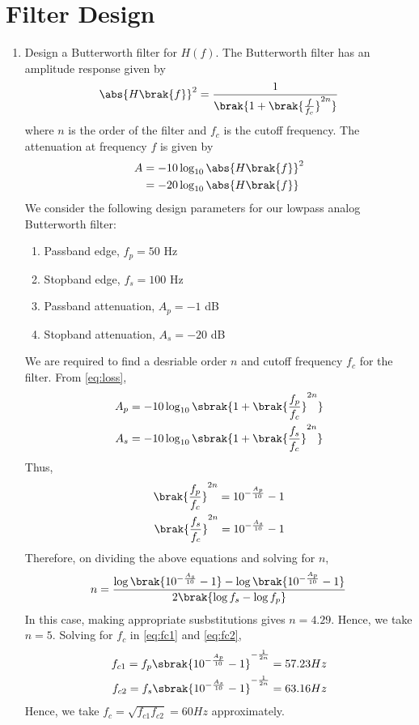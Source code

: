 \documentclass[journal,12pt,twocolumn]{IEEEtran}
\renewcommand\thesection{\arabic{section}}
\begin{document}
\section{Filter Design}
\begin{enumerate}[label=\thesection.\arabic*
,ref=\thesection.\theenumi]
\item Design a Butterworth filter for $H(f)$.
\solution The Butterworth filter has an amplitude response
given by
\begin{align}
    \abs{H\brak{f}}^2 = \frac{1}{\brak{1 + \brak{\frac{f}{f_c}}^{2n}}}
\end{align}
where $n$ is the order of the filter and $f_c$ is the cutoff
frequency. The attenuation at frequency $f$ is given by 
\begin{align}
    A &= -10\log_{10}\abs{H\brak{f}}^2 \\
      &= -20\log_{10}\abs{H\brak{f}}
    \label{eq:loss}
\end{align}
We consider the following design parameters for our
lowpass analog Butterworth filter:
\begin{enumerate}
    \item Passband edge, $f_p = 50$ Hz
    \item Stopband edge, $f_s = 100$ Hz
    \item Passband attenuation, $A_p = -1$ dB
    \item Stopband attenuation, $A_s = -20$ dB
\end{enumerate}
We are required to find a desriable order $n$ and cutoff
frequency $f_c$ for the filter. From \eqref{eq:loss},
\begin{align}
    A_p &= -10\log_{10}\sbrak{1 + \brak{\frac{f_p}{f_c}}^{2n}} \\
    A_s &= -10\log_{10}\sbrak{1 + \brak{\frac{f_s}{f_c}}^{2n}}
\end{align}
Thus,
\begin{align}
    \brak{\frac{f_p}{f_c}}^{2n} = 10^{-\frac{A_p}{10}} - 1 \label{eq:fc1} \\
    \brak{\frac{f_s}{f_c}}^{2n} = 10^{-\frac{A_s}{10}} - 1 \label{eq:fc2}
\end{align}
Therefore, on dividing the above equations and solving for $n$,
\begin{align}
    n = \frac{\log\brak{10^{-\frac{A_s}{10}} - 1} - 
    \log\brak{10^{-\frac{A_p}{10}} - 1}}{2\brak{\log{f_s} - \log{f_p}}}
\end{align}
In this case, making appropriate susbstitutions gives $n = 4.29$.
Hence, we take $n = 5$. Solving for $f_c$ in \eqref{eq:fc1} and
\eqref{eq:fc2},
\begin{align}
    f_{c1} = f_p\sbrak{10^{-\frac{A_p}{10}} - 1}^{-\frac{1}{2n}} = {57.23} Hz\\
    f_{c2} = f_s\sbrak{10^{-\frac{A_s}{10}} - 1}^{-\frac{1}{2n}} = {63.16} Hz
\end{align}
Hence, we take $f_c = \sqrt{f_{c1}f_{c2}} = {60} Hz$ approximately.


\end{enumerate}
\end{document}
